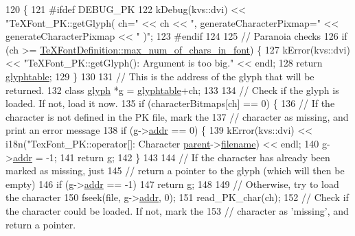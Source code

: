 \begin{DoxyCode}
120 \{
121 \textcolor{preprocessor}{#ifdef DEBUG\_PK}
122   kDebug(kvs::dvi) << \textcolor{stringliteral}{"TeXFont\_PK::getGlyph( ch="} << ch << \textcolor{stringliteral}{", generateCharacterPixmap="} << 
      generateCharacterPixmap << \textcolor{stringliteral}{" )"};
123 \textcolor{preprocessor}{#endif}
124 
125   \textcolor{comment}{// Paranoia checks}
126   \textcolor{keywordflow}{if} (ch >= \hyperlink{classTeXFontDefinition_a542c448736e5c591257ac3889f047d66}{TeXFontDefinition::max\_num\_of\_chars\_in\_font}) \{
127     kError(kvs::dvi) << \textcolor{stringliteral}{"TeXFont\_PK::getGlyph(): Argument is too big."} << endl;
128     \textcolor{keywordflow}{return} \hyperlink{classTeXFont_a4ec465c9b189f0845a25ad5c99903e5f}{glyphtable};
129   \}
130 
131   \textcolor{comment}{// This is the address of the glyph that will be returned.}
132   \textcolor{keyword}{class }\hyperlink{classglyph}{glyph} *g = \hyperlink{classTeXFont_a4ec465c9b189f0845a25ad5c99903e5f}{glyphtable}+ch;
133 
134   \textcolor{comment}{// Check if the glyph is loaded. If not, load it now.}
135   \textcolor{keywordflow}{if} (characterBitmaps[ch] == 0) \{
136     \textcolor{comment}{// If the character is not defined in the PK file, mark the}
137     \textcolor{comment}{// character as missing, and print an error message}
138     \textcolor{keywordflow}{if} (g->\hyperlink{classglyph_a11666f9bdd93248a6c58b69113cbd7b0}{addr} == 0) \{
139       kError(kvs::dvi) << i18n(\textcolor{stringliteral}{"TexFont\_PK::operator[]: Character %
      \hyperlink{classTeXFont_a72d8eb1f0377749cf4a45dfabf1c3dd5}{parent}->\hyperlink{classTeXFontDefinition_a28d5b98d97711686c6bc0e8df3bc9cc6}{filename}) << endl;
140       g->\hyperlink{classglyph_a11666f9bdd93248a6c58b69113cbd7b0}{addr} = -1;
141       \textcolor{keywordflow}{return} g;
142     \}
143 
144     \textcolor{comment}{// If the character has already been marked as missing, just}
145     \textcolor{comment}{// return a pointer to the glyph (which will then be empty)}
146     \textcolor{keywordflow}{if} (g->\hyperlink{classglyph_a11666f9bdd93248a6c58b69113cbd7b0}{addr} == -1)
147       \textcolor{keywordflow}{return} g;
148 
149     \textcolor{comment}{// Otherwise, try to load the character}
150     fseek(file, g->\hyperlink{classglyph_a11666f9bdd93248a6c58b69113cbd7b0}{addr}, 0);
151     read\_PK\_char(ch);
152     \textcolor{comment}{// Check if the character could be loaded. If not, mark the}
153     \textcolor{comment}{// character as 'missing', and return a pointer.}
}
\end{DoxyCode}
